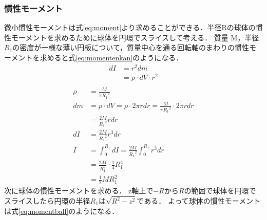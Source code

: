 \documentclass[a4paper,11pt]{ltjsarticle}
\begin{document}
\subsubsection{慣性モーメント}
微小慣性モーメントは式\eqref{eq:moment}より求めることができる．半径Rの球体の慣性モーメントを求めるために球体を円環でスライスして考える．
質量 M，半径 $R_1$の密度が一様な薄い円板について，質量中心を通る回転軸のまわりの慣性モーメントを求めると式\eqref{eq:momentenkan}のようになる．
\begin{align}
  dI & = r^2 dm \label{eq:moment} \\
     & = \rho \cdot dV \cdot r^2  \\
\end{align}
\begin{equation}
  \label{eq:momentenkan}
  \begin{aligned}
    \rho & = \frac{M}{\pi {R_1}^2}                                                        \\
    dm   & = \rho \cdot dV = \rho \cdot 2\pi r dr = \frac{M}{\pi {R_1}^2} \cdot 2\pi r dr \\
         & = \frac{2M}{{R_1}^2} r dr                                                      \\
    dI   & = \frac{2M}{{R_1}^2} r^3 dr                                                    \\
    I    & = \int_0^{R_1} dI = \frac{2M}{{R_1}^2} \int_0^{R_1} r^3 dr                     \\
         & = \frac{2M}{R_1^2} \cdot \frac{1}{4} R_1^4                                     \\
         & = \frac{1}{2} M R_1^2
  \end{aligned}
\end{equation}
次に球体の慣性モーメントを求める．
z軸上で$-R$から$R$の範囲で球体を円環でスライスしたら円環の半径$R_1$は$\sqrt{R^2 - z^2}$である．
よって球体の慣性モーメントは式\eqref{eq:momentball}のようになる．
\end{document}
